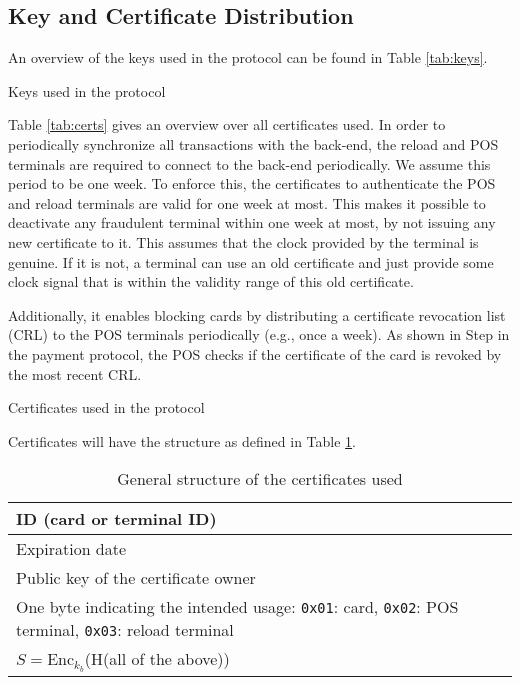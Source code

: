\subsection{Key and Certificate Distribution}

An overview of the keys used in the protocol can be found in Table \ref{tab:keys}.
\begin{table}[h]
    \centering
    
    \caption{Keys used in the protocol}
    \label{tab:keys}
\end{table}

Table \ref{tab:certs} gives an overview over all certificates used.
In order to periodically synchronize all transactions with the back-end, the reload and POS terminals are required to connect to the back-end periodically. We assume this period to be one week.
To enforce this, the certificates to authenticate the POS and reload terminals are valid for one week at most.
This makes it possible to deactivate any fraudulent terminal within one week at most, by not issuing any new certificate to it.
This assumes that the clock provided by the terminal is genuine.
If it is not, a terminal can use an old certificate and just provide some clock signal that is within the validity range of this old certificate.

Additionally, it enables blocking cards by distributing a certificate revocation list (CRL) to the POS terminals periodically (e.g., once a week).
As shown in Step 
in the payment protocol, the POS checks if the certificate of the card is revoked by the most recent CRL.

\begin{table}[h]
    \centering
    
    \caption{Certificates used in the protocol}
    \label{tab:certs}
\end{table}

Certificates will have the structure as defined in Table \ref{tab:certStructure}.
\begin{table}[h]
    \centering
    \begin{tabular}{|p{8cm}|}
    \hline
        ID (card or terminal ID) \\
    \hline
        Expiration date \\
    \hline
        Public key of the certificate owner \\
    \hline
        One byte indicating the intended usage: \texttt{0x01}: card, \texttt{0x02}: POS terminal, \texttt{0x03}: reload terminal \\
    \hline
        $S = \textrm{Enc}_{k_b}$(H(all of the above)) \\
    \hline
    \end{tabular}
    \caption{General structure of the certificates used}
    \label{tab:certStructure}
\end{table}

